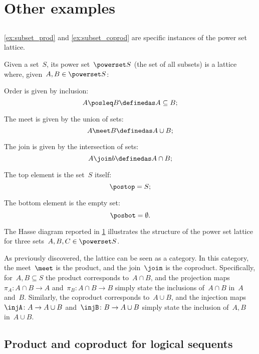 \section{Other examples}

\subsection{}
\cref{ex:subset_prod} and \cref{ex:subset_coprod} are specific instances of the power set lattice.

\begin{definition}
  \label{def:power-set-as-lattice}
Given a set~$S$, its power set~$\powerset S$ (the set of all subsets) is a lattice where, given~$A,B\in \powerset S$:
\begin{compactitem}
  \item Order is given by inclusion:
  \begin{equation*}
    A\posleq B \definedas A\subseteq B;
  \end{equation*}
  \item The meet is given by the union of sets:
  \begin{equation*}
    A\meet B \definedas A\cup B;
  \end{equation*}
  \item The join is given by the intersection of sets:
  \begin{equation*}
    A\join b \definedas A\cap B;
  \end{equation*}
  \item The top element is the set~$S$ itself:
  \begin{equation*}
    \postop = S;
  \end{equation*}
  \item The bottom element is the empty set:
  \begin{equation*}
    \posbot = \emptyset.
  \end{equation*}
\end{compactitem}
\end{definition}

The Hasse diagram reported in \cref{fig:prod_coprod_power} illustrates the structure of the power set lattice for three sets~$A,B,C\in \powerset S$.

\begin{figure}[h]
  \begin{center}
  \end{center}
  \caption{}
  \label{fig:prod_coprod_power}
\end{figure}
As previously discovered, the lattice can be seen as a category.
In this category, the meet~$\meet$ is the product, and the join~$\join$ is the coproduct.
Specifically, for~$A,B\subseteq S$ the product corresponds to~$A\cap B$, and the projection maps~$\pi_A\colon A\cap B\to A$ and~$\pi_B\colon A\cap B\to B$ simply state the inclusions of~$A\cap B$ in~$A$ and~$B$.
Similarly, the coproduct corresponds to~$A\cup B$, and the injection maps~$\injA\colon A\to A\cup B$ and~$\injB\colon B\to A\cup B$ simply state the inclusion of~$A,B$ in~$A\cup B$.

\subsection{Product and coproduct for logical sequents}

